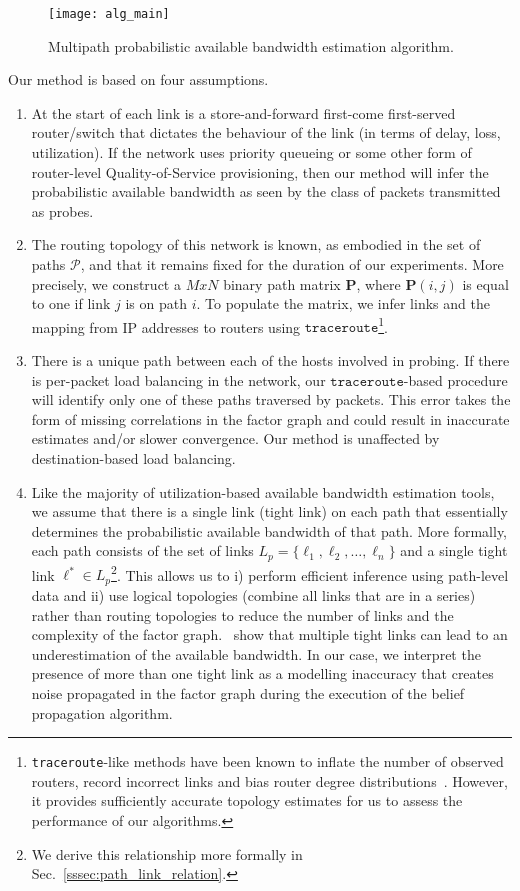 \documentclass[final,5p,times,twocolumn]{elsarticle}
\newcommand{\CP}{\mathcal{P}}
\begin{document}
\begin{figure}[!h]
	\centering
	\texttt{[image: alg\_main]}
	\caption{Multipath probabilistic available bandwidth estimation algorithm.\label{fig:alg_main}}
\end{figure}

Our method is based on four assumptions.  
\begin{enumerate}
\item At the start of each link is a store-and-forward first-come first-served router/switch that dictates the behaviour of the link (in terms of delay, loss, utilization).  If the network uses priority queueing or some other form of router-level Quality-of-Service provisioning, then our method will infer the probabilistic available bandwidth as seen by the class of packets transmitted as probes.
\item The routing topology of this network is known, as embodied in the set of paths $\CP$, and that it remains fixed for the duration of our experiments.  
More precisely, we construct a $MxN$ binary path matrix $\mathbf{P}$, where $\mathbf{P}(i,j)$ is equal to one if link $j$ is on path $i$.  
To populate the matrix, we infer links and the mapping from IP addresses to routers using $\texttt{traceroute}$\footnote{\texttt{traceroute}-like methods have been known to inflate the number of observed routers, record incorrect links and bias router degree distributions~\cite{she:08}.  However, it provides sufficiently accurate topology estimates for us to assess the performance of our algorithms.}.  
\item There is a unique path between each of the hosts involved in probing.  If there is per-packet load balancing in the network, our $\texttt{traceroute}$-based procedure will identify only one of these paths traversed by packets.  This error takes the form of missing correlations in the factor graph and could result in inaccurate estimates and/or slower convergence.  Our method is unaffected by destination-based load balancing.
\item Like the majority of utilization-based available bandwidth estimation tools, we assume that there is a single link (tight link) on each path that essentially determines the probabilistic available bandwidth of that path.  More formally, each path consists of the set of links $L_p = \{\ell_1,\ell_2,\dots,\ell_n\}$ and a single tight link ${\ell}^* \in L_p$\footnote{We derive this relationship more formally in Sec.~\ref{sssec:path_link_relation}.}.  This allows us to i) perform efficient inference using path-level data and ii) use logical topologies (combine all links that are in a series) rather than routing topologies to reduce the number of links and the complexity of the factor graph.~\citet{jai:03} show that multiple tight links can lead to an underestimation of the available bandwidth.  In our case, we interpret the presence of more than one tight link as a modelling inaccuracy that creates noise propagated in the factor graph during the execution of the belief propagation algorithm.
\end{enumerate}
	
\end{document}
